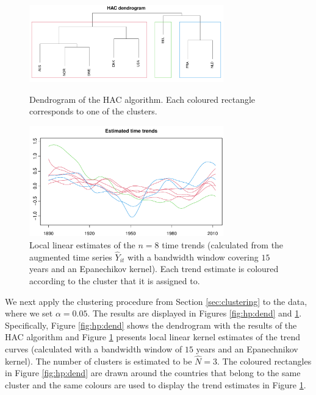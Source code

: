 \documentclass[12pt]{article}
\begin{document}
\begin{figure}[t!]
\begin{center}
\includegraphics[width=0.75\textwidth]{../output/plots/hp/dendrogram}
\caption{Dendrogram of the HAC algorithm. Each coloured rectangle corresponds to one of the clusters.}\label{fig:hp:dend}

\includegraphics[width=0.75\textwidth]{../output/plots/hp/all_clusters}
\caption{Local linear estimates of the $n=8$ time trends (calculated from the augmented time series $\widehat{Y}_{it}$ with a bandwidth window covering $15$ years and an Epanechikov kernel). Each trend estimate is coloured according to the cluster that it is assigned to. }\label{fig:hp:all_clusters}
\end{center}
\end{figure}


We next apply the clustering procedure from Section \ref{sec:clustering} to the data, where we set $\alpha = 0.05$. The results are displayed in Figures \ref{fig:hp:dend} and \ref{fig:hp:all_clusters}. Specifically, Figure \ref{fig:hp:dend} shows the dendrogram with the results of the HAC algorithm and Figure \ref{fig:hp:all_clusters} presents local linear kernel estimates of the trend curves (calculated with a bandwidth window of $15$ years and an Epanechnikov kernel). The number of clusters is estimated to be $\widehat{N} = 3$. The coloured rectangles in Figure \ref{fig:hp:dend} are drawn around the countries that belong to the same cluster and the same colours are used to display the trend estimates in Figure \ref{fig:hp:all_clusters}.
\end{document}
